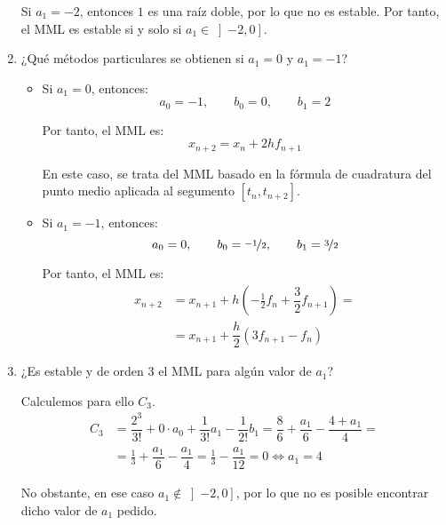 \begin{ejercicio}
\begin{enumerate}
        Si $a_1=-2$, entonces $1$ es una raíz doble, por lo que no es estable. Por tanto, el MML es estable si y solo si $a_1\in \left]-2,0\right]$.
        \item ¿Qué métodos particulares se obtienen si $a_1 = 0$ y $a_1 = -1$?
        \begin{itemize}
            \item Si $a_1 = 0$, entonces:
            \begin{equation*}
                a_0 = -1,\qquad b_0 = 0,\qquad b_1 = 2
            \end{equation*}

            Por tanto, el MML es:
            \begin{equation*}
                x_{n+2} = x_n + 2h f_{n+1}
            \end{equation*}

            En este caso, se trata del MML basado en la fórmula de cuadratura del punto medio aplicada al segumento $[t_n, t_{n+2}]$.

            \item Si $a_1 = -1$, entonces:
            \begin{equation*}
                a_0 = 0,\qquad b_0 = \nicefrac{-1}{2},\qquad b_1 = \nicefrac{3}{2}
            \end{equation*}

            Por tanto, el MML es:
            \begin{align*}
                x_{n+2} &= x_{n+1} +h\left(-\frac{1}{2}f_n + \dfrac{3}{2}f_{n+1}\right)
                =\\&= x_{n+1} +\dfrac{h}{2}\left(3f_{n+1}-f_n\right)
            \end{align*}
        \end{itemize}
        \item ¿Es estable y de orden 3 el MML para algún valor de $a_1$?
        
        Calculemos para ello $C_3$.
        \begin{align*}
            C_3 &= \dfrac{2^3}{3!}+ 0\cdot a_0 + \dfrac{1}{3!}a_1 -\dfrac{1}{2!}b_1
            = \dfrac{8}{6} + \dfrac{a_1}{6} - \dfrac{4+a_1}{4}
            =\\&= \frac{1}{3}+ \dfrac{a_1}{6} -\dfrac{a_1}{4}
            = \frac{1}{3}- \dfrac{a_1}{12}
            =0 \iff a_1=4
        \end{align*}

        No obstante, en ese caso $a_1\notin \left]-2,0\right]$, por lo que no es posible encontrar dicho valor de $a_1$ pedido.
    \end{enumerate}
\end{ejercicio}

